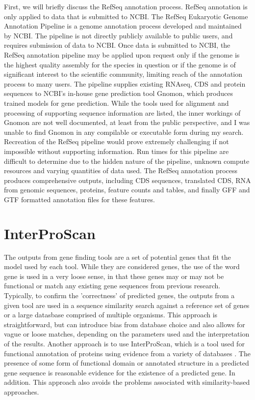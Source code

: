First, we will briefly discuss the RefSeq annotation process. RefSeq
annotation is only applied to data that is submitted to NCBI. The
RefSeq Eukaryotic Genome Annotation Pipeline\cite{NCBI2024} is a
genome annotation process developed and maintained by NCBI. The
pipeline is not directly publicly available to public users, and
requires submission of data to NCBI. Once data is submitted to NCBI,
the RefSeq annotation pipeline may be applied upon request only if the
genome is the highest quality assembly for the species in question or
if the genome is of significant interest to the scientific community,
limiting reach of the annotation process to many users. The pipeline
supplies existing RNAseq, CDS and protein sequences to NCBI's in-house
gene prediction tool Gnomon, which produces trained models for gene
prediction. While the tools used for alignment and processing of
supporting sequence information are listed, the inner workings of
Gnomon are not well documented, at least from the public perspective,
and I was unable to find Gnomon in any compilable or executable form
during my search. Recreation of the RefSeq pipeline would prove
extremely challenging if not impossible without supporting
information. Run times for this pipeline are difficult to determine
due to the hidden nature of the pipeline, unknown compute resources
and varying quantities of data used. The RefSeq annotation process
produces comprehensive outputs, including CDS sequences, translated
CDS, RNA from genomic sequences, proteins, feature counts and tables,
and finally GFF and GTF formatted annotation files for these features.

\section{InterProScan}
The outputs from gene finding tools are a set of potential genes that
fit the model used by each tool. While they are considered genes, the
use of the word gene is used in a very loose sense, in that these
genes may or may not be functional or match any existing gene
sequences from previous research. Typically, to confirm the
'correctness' of predicted genes, the outputs from a given tool are
used in a sequence similarity search against a reference set of genes
or a large datasbase comprised of multiple organisms. This approach is
straightforward, but can introduce bias from database choice and also
allows for vague or loose matches, depending on the parameters used
and the interpretation of the results. Another approach is to use
InterProScan, which is a tool used for functional annotation of
proteins using evidence from a variety of databases
\cite{10.1093/nar/gkac993}. The presence of some form of functional
domain or annotated structure in a predicted gene sequence is
reasonable evidence for the existence of a predicted gene. In
addition. This approach also avoids the problems associated with
similarity-based approaches.


